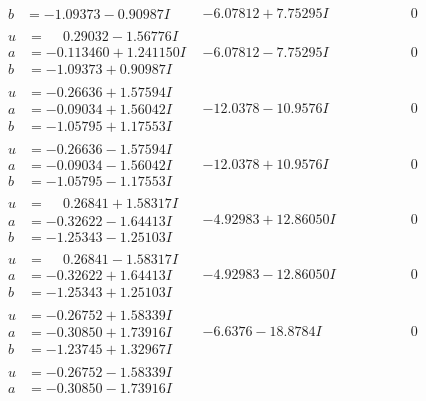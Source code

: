 \documentclass[1p]{elsarticle_modified}
\theoremstyle{definition}
\begin{document}
$$\begin{array}{c|c|c}
\begin{aligned}
b &= -1.09373 - 0.90987 I\end{aligned}
 & -6.07812 + 7.75295 I & \phantom{-0.000000 } 0 \\ \hline\begin{aligned}
u &= \phantom{-}0.29032 - 1.56776 I \\
a &= -0.113460 + 1.241150 I \\
b &= -1.09373 + 0.90987 I\end{aligned}
 & -6.07812 - 7.75295 I & \phantom{-0.000000 } 0 \\ \hline\begin{aligned}
u &= -0.26636 + 1.57594 I \\
a &= -0.09034 + 1.56042 I \\
b &= -1.05795 + 1.17553 I\end{aligned}
 & -12.0378 - 10.9576 I & \phantom{-0.000000 } 0 \\ \hline\begin{aligned}
u &= -0.26636 - 1.57594 I \\
a &= -0.09034 - 1.56042 I \\
b &= -1.05795 - 1.17553 I\end{aligned}
 & -12.0378 + 10.9576 I & \phantom{-0.000000 } 0 \\ \hline\begin{aligned}
u &= \phantom{-}0.26841 + 1.58317 I \\
a &= -0.32622 - 1.64413 I \\
b &= -1.25343 - 1.25103 I\end{aligned}
 & -4.92983 + 12.86050 I & \phantom{-0.000000 } 0 \\ \hline\begin{aligned}
u &= \phantom{-}0.26841 - 1.58317 I \\
a &= -0.32622 + 1.64413 I \\
b &= -1.25343 + 1.25103 I\end{aligned}
 & -4.92983 - 12.86050 I & \phantom{-0.000000 } 0 \\ \hline\begin{aligned}
u &= -0.26752 + 1.58339 I \\
a &= -0.30850 + 1.73916 I \\
b &= -1.23745 + 1.32967 I\end{aligned}
 & -6.6376 - 18.8784 I & \phantom{-0.000000 } 0 \\ \hline\begin{aligned}
u &= -0.26752 - 1.58339 I \\
a &= -0.30850 - 1.73916 I \\

\end{aligned}
\end{array}$$
\end{document}
